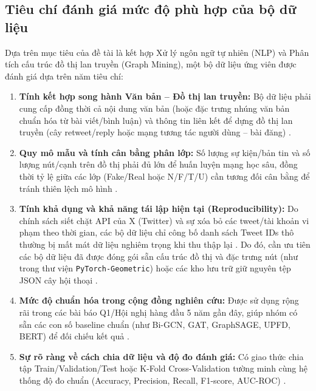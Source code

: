 \documentclass[11pt,a4paper]{extreport}
\begin{document}
\subsection{Tiêu chí đánh giá mức độ phù hợp của bộ dữ liệu}
Dựa trên mục tiêu của đề tài là kết hợp Xử lý ngôn ngữ tự nhiên (NLP) và Phân tích cấu trúc đồ thị lan truyền (Graph Mining), một bộ dữ liệu ứng viên được đánh giá dựa trên năm tiêu chí:
\begin{enumerate}
    \item \textbf{Tính kết hợp song hành Văn bản -- Đồ thị lan truyền:} Bộ dữ liệu phải cung cấp đồng thời cả nội dung văn bản (hoặc đặc trưng nhúng văn bản chuẩn hóa từ bài viết/bình luận) và thông tin liên kết để dựng đồ thị lan truyền (cây retweet/reply hoặc mạng tương tác người dùng -- bài đăng) \cite{noauthor_disinformation_2024, noauthor_comparative_2024}.
    \item \textbf{Quy mô mẫu và tính cân bằng phân lớp:} Số lượng sự kiện/bản tin và số lượng nút/cạnh trên đồ thị phải đủ lớn để huấn luyện mạng học sâu, đồng thời tỷ lệ giữa các lớp (Fake/Real hoặc N/F/T/U) cần tương đối cân bằng để tránh thiên lệch mô hình \cite{noauthor_fake_2024, noauthor_co-attention_2025}.
    \item \textbf{Tính khả dụng và khả năng tái lập hiện tại (Reproducibility):} Do chính sách siết chặt API của X (Twitter) và sự xóa bỏ các tweet/tài khoản vi phạm theo thời gian, các bộ dữ liệu chỉ công bố danh sách Tweet IDs thô thường bị mất mát dữ liệu nghiêm trọng khi thu thập lại \cite{noauthor_exploiting_2024}. Do đó, cần ưu tiên các bộ dữ liệu đã được đóng gói sẵn cấu trúc đồ thị và đặc trưng nút (như trong thư viện \texttt{PyTorch-Geometric}) hoặc các kho lưu trữ giữ nguyên tệp JSON cây hội thoại \cite{noauthor_ensemble_2024, noauthor_co-attention_2025}.
    \item \textbf{Mức độ chuẩn hóa trong cộng đồng nghiên cứu:} Được sử dụng rộng rãi trong các bài báo Q1/Hội nghị hàng đầu 5 năm gần đây, giúp nhóm có sẵn các con số baseline chuẩn (như Bi-GCN, GAT, GraphSAGE, UPFD, BERT) để đối chiếu kết quả \cite{noauthor_fake_2024, noauthor_co-attention_2025}.
    \item \textbf{Sự rõ ràng về cách chia dữ liệu và độ đo đánh giá:} Có giao thức chia tập Train/Validation/Test hoặc K-Fold Cross-Validation tường minh cùng hệ thống độ đo chuẩn (Accuracy, Precision, Recall, F1-score, AUC-ROC) \cite{noauthor_comparative_2024, noauthor_integrating_2025}.
\end{enumerate}
\end{document}
